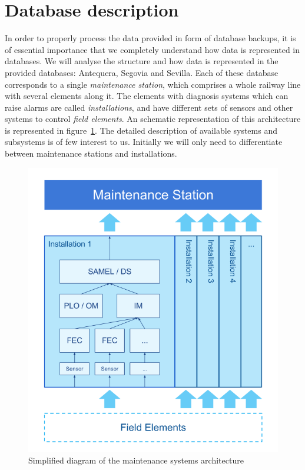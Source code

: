 \section{Database description}\label{sec:database_description}
In order to properly process the data provided in form of database backups, it is of essential importance that we completely understand how data is represented in databases. We will analyse the structure and how data is represented in the provided databases: Antequera, Segovia and Sevilla. Each of these database corresponds to a single \emph{maintenance station}, which comprises a whole railway line with several elements along it. The elements with diagnosis systems which can raise alarms are called \emph{installations}, and have different sets of sensors and other systems to control \emph{field elements}. An schematic representation of this architecture is represented in figure~\ref{fig:arch_stations}. The detailed description of available systems and subsystems is of few interest to us. Initially we will only need to differentiate between maintenance stations and installations.

\begin{figure}[hbt]
\includegraphics[width=\textwidth]{./img/arch_stations.png}
\caption{Simplified diagram of the maintenance systems architecture} \label{fig:arch_stations}
\end{figure}

